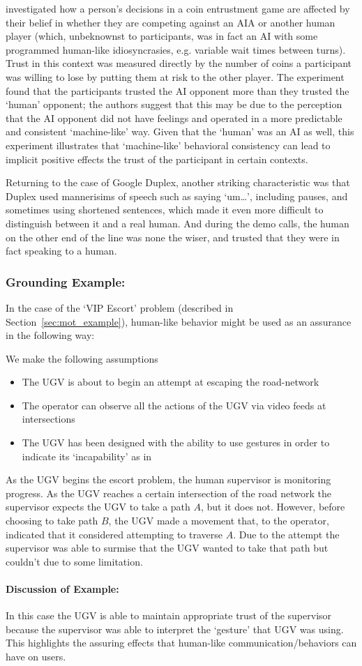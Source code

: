 \citet{Wu2016-ei} investigated how a person's decisions in a coin entrustment game are affected by their belief in whether they are competing against an AIA or another human player (which, unbeknownst to participants, was in fact an AI with some programmed human-like idiosyncrasies, e.g. variable wait times between turns). Trust in this context was measured directly by the number of coins a participant was willing to lose by putting them at risk to the other player. The experiment found that the participants trusted the AI opponent more than they trusted the `human' opponent; the authors suggest that this may be due to the perception that the AI opponent did not have feelings and operated in a more predictable and consistent `machine-like' way. Given that the `human' was an AI as well, this experiment illustrates that `machine-like' behavioral consistency can lead to implicit positive effects the trust of the participant in certain contexts.

Returning to the case of Google Duplex, another striking characteristic was that Duplex used mannerisims of speech such as saying `um\ldots', including pauses, and sometimes using shortened sentences, which made it even more difficult to distinguish between it and a real human. And during the demo calls, the human on the other end of the line was none the wiser, and trusted that they were in fact speaking to a human.
 

\subsubsection{Grounding Example:}
In the case of the `VIP Escort' problem (described in Section~\ref{sec:mot_example}), human-like behavior might be used as an assurance in the following way:

We make the following assumptions

\begin{itemize}
    \item The UGV is about to begin an attempt at escaping the road-network
    \item The operator can observe all the actions of the UGV via video feeds at intersections
    \item The UGV has been designed with the ability to use gestures in order to indicate its `incapability' as in \cite{Kwon2018-xt}
\end{itemize}

As the UGV begins the escort problem, the human supervisor is monitoring progress. As the UGV reaches a certain intersection of the road network the supervisor expects the UGV to take a path $A$, but it does not. However, before choosing to take path $B$, the UGV made a movement that, to the operator, indicated that it considered attempting to traverse $A$. Due to the attempt the supervisor was able to surmise that the UGV wanted to take that path but couldn't due to some limitation.

\paragraph{\textbf{Discussion of Example:}} In this case the UGV is able to maintain appropriate trust of the supervisor because the supervisor was able to interpret the `gesture' that UGV was using. This highlights the assuring effects that human-like communication/behaviors can have on users.
